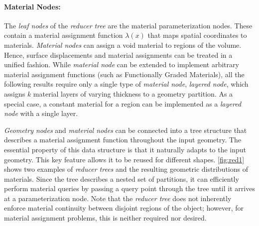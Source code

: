 \paragraph{Material Nodes:} The \emph{leaf nodes} of the \emph{reducer tree} are the material parameterization nodes. These contain a material assignment function $\lambda\left(x\right)$ that maps spatial coordinates to materials. \emph{Material nodes} can assign a void material to regions of the volume. Hence, surface displacements and material assignments can be treated in a unified fashion.
While \emph{material node} can be extended to implement arbitrary material assignment functions (such as Functionally Graded Materials), all the following results require only a single type of \emph{material node}, \emph{layered node}, which assigns $k$ material layers of varying thickness to a geometry partition.
As a special case, a constant material for a region can be implemented as a \emph{layered node} with a single layer.

\emph{Geometry nodes} and \emph{material nodes} can be connected into a tree structure that describes a material assignment function throughout the input geometry. 
The essential property of this data structure is that it naturally adapts to the input geometry. This key feature allows it to be reused for different shapes.
\autoref{fig:red1} shows two examples of \emph{reducer trees} and the resulting geometric distributions of materials.
Since the tree describes a nested set of partitions, it can efficiently perform material queries by passing a query point through the tree until it arrives at a parameterization node. 
Note that the \emph{reducer tree} does not inherently enforce material continuity between disjoint regions of the object; however, for material assignment problems, this is neither required nor desired. 

